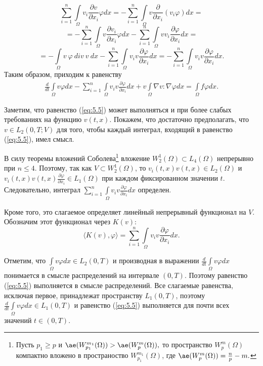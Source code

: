$$\sum_{i=1}^{n}\int\limits_\Omega v_i\frac{\partial v}{\partial x_i}\varphi dx=-\sum_{i=1}^{n}\int\limits_\Omega v\frac{\partial}{\partial x_i}(v_i\varphi)dx=$$
$$=-\sum_{i=1}^{n}\int\limits_\Omega v\frac{\partial v_i}{\partial x_i}\varphi dx-\sum_{i=1}^{n}\int\limits_\Omega vv_i\frac{\partial\varphi}{\partial x_i} dx=$$
$$=-\int\limits_\Omega v \ \varphi \ div \ v \ dx-\sum_{i=1}^{n}\int\limits_\Omega v_i v\frac{\partial\varphi}{\partial x_i}dx=
-\sum_{i=1}^{n}\int\limits_\Omega v_i v\frac{\partial\varphi}{\partial x_i}dx.$$
Таким образом, приходим к равенству
\begin{equation}\label{eq:5.5}
    \begin{gathered}
        \frac{d}{dt}\int\limits_\Omega v \varphi dx-\sum_{i=1}^{n}\int\limits_\Omega v_i v
        \frac{\partial \varphi }{\partial x_i}dx + v\int\limits_\Omega \nabla v :\nabla\varphi dx
        =\int\limits_\Omega f\varphi dx.
    \end{gathered}
\end{equation}

Заметим, что равенство (\ref{eq:5.5}) может выполняться и при более слабых требованиях на функцию $v(t, x)$.
Покажем, что достаточно предполагать, что $v\in L_2(0, T;V)$ для того, чтобы каждый интеграл, входящий в равенство (\ref{eq:5.5}), имел смысл.
\clearpage

В силу теоремы вложений Соболева\footnote{ Пусть $p_1\ge p$ и $\ae(W_{p_1}^{m_1}(\Omega))>\ae(W_{p}^{m}(\Omega)),$ то пространство $W_{p}^{m}(\Omega)$ компактно
вложено в пространоство $W_{p_1}^{m_1}(\Omega)$, где $\ae(W_{p}^{m}(\Omega))=\frac{n}{p}-m.$} вложение $W^{1}_{2}(\Omega)\subset L_4(\Omega)$ непрерывно при $n \leqslant 4$.
Поэтому, так как $V\subset W^{1}_{2}(\Omega)$, то $v_i(t, x)v(t, x)\in L_2(\Omega)$ и $v_i(t, x)v(t, x)\frac{\partial \varphi }{\partial x_i} \in L_1(\Omega)$
при каждом фиксированном значении $t$. Следовательно, интеграл $\sum\limits_{i=1}^{n}\int\limits_\Omega v_iv \frac{\partial\varphi}{\partial x_i}dx$ определен.

Кроме того, это слагаемое определяет линейный непрерывный функционал на $V$. Обозначим этот функционал через $K(v)$:
$$\langle K(v),\varphi \rangle = \sum_{i=1}^{n}\int\limits_\Omega v_i v \frac{\partial \varphi}{\partial x_i}dx.$$

Отметим, что $\int\limits_\Omega v \varphi dx\in L_2(0, T)$ и производная в выражении \linebreak
$\frac{d}{dt}\int\limits_\Omega v \varphi dx$
понимается в смысле распределений на интервале $(0, T)$. Поэтому равенство (\ref{eq:5.5}) выполняется в смысле распределений.
Все слагаемые равенства, исключая первое, принадлежат пространству $L_1(0, T)$, поэтому $\frac{d}{dt}\int\limits_\Omega v \varphi dx\in L_1(0, T)$
и равенство (\ref{eq:5.5}) выполняется для почти всех значений $t\in (0, T)$.


